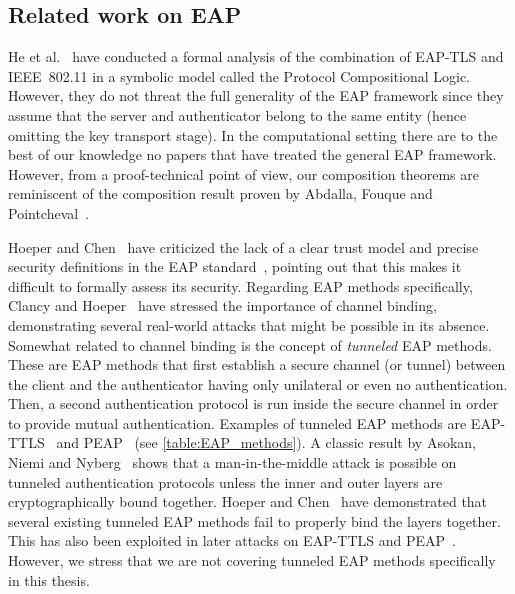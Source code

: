 \subsection{Related work on EAP}\label{sec:generic_composition_results:modeling_EAP:related_work}
He et al.~\cite{CCS:HSDDM05} have conducted a formal analysis of the combination of EAP-TLS and IEEE~802.11 in a symbolic model called the Protocol Compositional Logic.
However,
they do not threat the full generality of the EAP framework since they assume that the server and authenticator belong to the same entity
(hence omitting the key transport stage).  
In the computational setting there are to the best of our knowledge no papers that have treated the general EAP framework. 
However,
from a proof-technical point of view,
our composition theorems are reminiscent of the composition result proven by Abdalla, Fouque and Pointcheval~\cite{PKC:AbdFouPoi05}.
 

Hoeper and Chen~\cite{HoeperC:2007:EAP_claims_fail} have criticized the lack of a clear trust model and precise security definitions in the EAP standard~\cite{IETF:RFC3748:EAP},
pointing out that this makes it difficult to formally assess its security.
Regarding EAP methods specifically,
Clancy and Hoeper~\cite{ClancyH:2009:making_the_case_EAP_cb} have stressed the importance of channel binding,
demonstrating several real-world attacks that might be possible in its absence.
Somewhat related to channel binding is the concept of \emph{tunneled} EAP methods.
These are EAP methods that first establish a secure channel (or tunnel) between the client and the authenticator having only unilateral or even no authentication.
Then, a second authentication protocol is run inside the secure channel in order to provide mutual authentication.
Examples of tunneled EAP methods are EAP-TTLS~\cite{IETF:RFC5281:EAP-TTLS} and PEAP~\cite{IETF:draft:PEAPv2}
(see \cref{table:EAP_methods}).
A classic result by Asokan, Niemi and Nyberg~\cite{Asokan:2003:MitM-tunneling} shows that a man-in-the-middle attack is possible on tunneled authentication protocols unless the inner and outer layers are cryptographically bound together.
Hoeper and Chen~\cite{HoeperC:2010:inconvenient_tunneled} have demonstrated that several existing tunneled EAP methods fail to properly bind the layers together.
This has also been exploited in later attacks on EAP-TTLS and PEAP~\cite{SP:BDFPS14}.
However,
we stress that we are not covering tunneled EAP methods specifically in this thesis.

